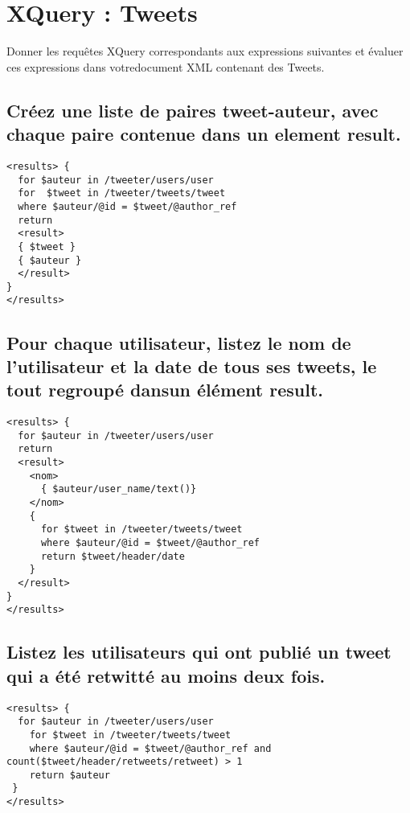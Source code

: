 \chapter{XQuery : Tweets}
Donner les requêtes XQuery correspondants aux expressions suivantes et évaluer ces expressions dans votredocument XML contenant des Tweets.

\section{Créez une liste de paires tweet-auteur, avec chaque paire contenue dans un element result.}
\begin{verbatim}
<results> {
  for $auteur in /tweeter/users/user 
  for  $tweet in /tweeter/tweets/tweet
  where $auteur/@id = $tweet/@author_ref  
  return
  <result>
  { $tweet }
  { $auteur }
  </result>  
}
</results>
\end{verbatim}


\section{Pour chaque utilisateur, listez le nom de l’utilisateur et la date de tous ses tweets, le tout regroupé dansun élément result.}
\begin{verbatim}
<results> {
  for $auteur in /tweeter/users/user
  return
  <result>
    <nom>
      { $auteur/user_name/text()}
    </nom> 
    {
      for $tweet in /tweeter/tweets/tweet
      where $auteur/@id = $tweet/@author_ref  
      return $tweet/header/date
    }
  </result>
}
</results>
\end{verbatim}

\section{Listez les utilisateurs qui ont publié un tweet qui a été retwitté au moins deux fois.}
\begin{verbatim}
<results> {
  for $auteur in /tweeter/users/user
    for $tweet in /tweeter/tweets/tweet
    where $auteur/@id = $tweet/@author_ref and count($tweet/header/retweets/retweet) > 1
    return $auteur
 }
</results>
\end{verbatim}

